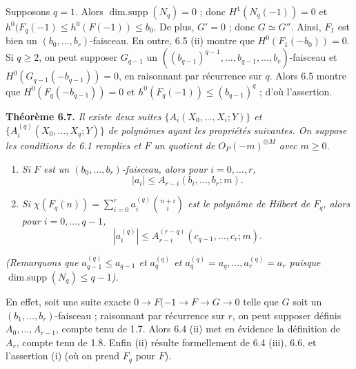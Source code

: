 

Supposons $q=1$. Alors $\operatorname{dim{.}supp}(N_q)=0$ ; donc $H^1(N_q(-1))=0$ et $h^0(F_q(-1)\le h^0(F(-1))\le b_0$. De plus, $G'=0$ ; donc $G\simeq G''$. Ainsi, $F_1$ est bien un $(b_0,\ldots,b_r)$-faisceau. En outre, 6.5 (ii) montre que $H^0(F_1(-b_0))=0$. Si $q\ge2$, on peut supposer $G_{q-1}$ un $((b_{q-1})^{q-1},\ldots,b_{q-1},\ldots,b_r)$-faisceau et $H^0(G_{q-1}(-b_{q-1}))=0$, en raisonnant par r\'ecurrence sur $q$. Alors 6.5 montre que $H^0(F_q(-b_{q-1}))=0$ et $h^0(F_q(-1))\le (b_{q-1})^q$ ; d'o\`u l'assertion.

\textbf{Th\'eor\`eme 6.7.} \emph{Il existe deux suites $\{A_i(X_0,\ldots,X_i;Y)\}$ et $\{A_i^{(q)}(X_0,\ldots,X_q;Y)\}$ de polyn\^omes ayant les propri\'et\'es suivantes. On suppose les conditions de 6.1 remplies et $F$ un quotient de ${O}_P(-m)^{\oplus M}$ avec $m\ge0$.}
\begin{enumerate}[label=(\roman*)]
\item \emph{Si $F$ est un $(b_0,\ldots,b_r)$-faisceau, alors pour $i=0,\ldots,r$,}
\[
   |a_i|\le A_{r-i}(b_i,\ldots,b_r;m).
\]
\item \emph{Si $\chi(F_q(n))=\sum_{i=0}^{r} a_i^{(q)}\binom{n+i}{i}$ est le polyn\^ome de Hilbert de $F_q$, alors pour $i=0,\ldots,q-1$,}
\[
   |a_i^{(q)}|\le A_{r-i}^{(r-q)}(c_{q-1},\ldots,c_r;m).
\]
\end{enumerate}
\emph{(Remarquons que $a_{q-1}^{(q)}\le a_{q-1}$ et $a_q^{(q)}$ et $a_q^{(q)}=a_q,\ldots,a_r^{(q)}=a_r$ puisque $\operatorname{dim{.}supp}(N_q)\le q-1$).}

En effet, soit une suite exacte $0\to F(-1\to F\to G\to0$ telle que $G$ soit un $(b_1,\ldots,b_r)$-faisceau ; raisonnant par r\'ecurrence sur $r$, on peut supposer d\'efinis $A_0,\ldots,A_{r-1}$, compte tenu de 1.7. Alors 6.4 (ii) met en \'evidence la d\'efinition de $A_r$, compte tenu de 1.8. Enfin (ii) r\'esulte formellement de 6.4 (iii), 6.6, et l'assertion (i) (o\`u on prend $F_q$ pour $F$).

